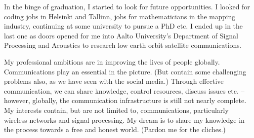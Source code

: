 \documentclass{article}
\begin{document}
{        In the binge of graduation, I started to look for future opportunities. I looked for coding jobs in Helsinki and Tallinn, jobs for mathematicians in the mapping industry, continuing at some university to pursue a PhD etc. I ended up in the last one as doors opened for me into Aalto University's Department of Signal Processing and Acoustics to research low earth orbit satellite communications.

        My professional ambitions are in improving the lives of people globally. Communications play an essential in the picture. (But contain some challenging problems also, as we have seen with the social media.) Through effective communication, we can share knowledge, control resources, discuss issues etc. – however, globally, the communication infrastructure is still not nearly complete. My interests contain, but are not limited to, communications, particularly wireless networks and signal processing. My dream is to share my knowledge in the process towards a free and honest world. (Pardon me for the cliches.)
        
        }

\end{document}
